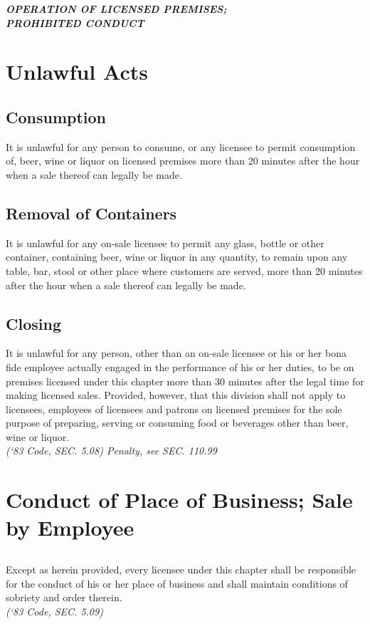 \begin{center}
    \emph{\textbf{\LARGE{OPERATION OF LICENSED PREMISES;\\
    PROHIBITED CONDUCT}}}
\end{center}

\setcounter{section}{39}
\section{Unlawful Acts}
\subsection{Consumption}
It is unlawful for any person to consume, or any licensee to permit consumption of, beer, wine or liquor on licensed premises more than 20 minutes after the hour when a sale thereof can legally be made.
\subsection{Removal of Containers}
It is unlawful for any on-sale licensee to permit any glass, bottle or other container, containing beer, wine or liquor in any quantity, to remain upon any table, bar, stool or other place where customers are served, more than 20 minutes after the hour when a sale thereof can legally be made.
\subsection{Closing}
It is unlawful for any person, other than an on-sale licensee or his or her bona fide employee actually engaged in the performance of his or her duties, to be on premises licensed under this chapter more than 30 minutes after the legal time for making licensed sales.  Provided, however, that this division shall not apply to licensees, employees of licensees and patrons on licensed premises for the sole purpose of preparing, serving or consuming food or beverages other than beer, wine or liquor.\\
\emph{(‘83 Code, SEC. 5.08)  Penalty, see SEC. 110.99}
\section{Conduct of Place of Business; Sale by Employee}
\subsection{}
Except as herein provided, every licensee under this chapter shall be responsible for the conduct of his or her place of business and shall maintain conditions of sobriety and order therein.\\
\emph{(‘83 Code, SEC. 5.09)}
